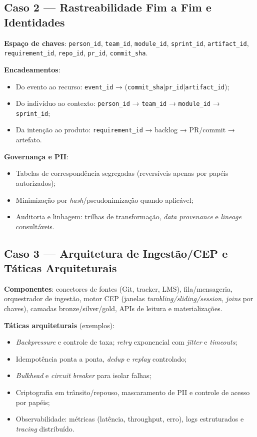 \subsection{Caso 2 — Rastreabilidade Fim a Fim e Identidades}

\textbf{Espaço de chaves}: \texttt{person\_id}, \texttt{team\_id}, \texttt{module\_id}, \texttt{sprint\_id}, \texttt{artifact\_id}, \texttt{requirement\_id}, \texttt{repo\_id}, \texttt{pr\_id}, \texttt{commit\_sha}.

\textbf{Encadeamentos}:
\begin{itemize}
  \item Do evento ao recurso: \texttt{event\_id} → (\texttt{commit\_sha}|\texttt{pr\_id}|\texttt{artifact\_id});
  \item Do indivíduo ao contexto: \texttt{person\_id} → \texttt{team\_id} → \texttt{module\_id} → \texttt{sprint\_id};
  \item Da intenção ao produto: \texttt{requirement\_id} → backlog → PR/commit → artefato.
\end{itemize}

\textbf{Governança e PII}:
\begin{itemize}
  \item Tabelas de correspondência segregadas (reversíveis apenas por papéis autorizados);
  \item Minimização por \textit{hash}/pseudonimização quando aplicável;
  \item Auditoria e linhagem: trilhas de transformação, \textit{data provenance} e \textit{lineage} consultáveis.
\end{itemize}

\subsection{Caso 3 — Arquitetura de Ingestão/CEP e Táticas Arquiteturais}

\textbf{Componentes}: conectores de fontes (Git, tracker, LMS), fila/mensageria, orquestrador de ingestão, motor CEP (janelas \textit{tumbling/sliding/session}, \textit{joins} por chaves), camadas bronze/silver/gold, APIs de leitura e materializações.

\textbf{Táticas arquiteturais} (exemplos):
\begin{itemize}
  \item \textit{Backpressure} e controle de taxa; \textit{retry} exponencial com \textit{jitter} e \textit{timeouts};
  \item Idempotência ponta a ponta, \textit{dedup} e \textit{replay} controlado;
  \item \textit{Bulkhead} e \textit{circuit breaker} para isolar falhas;
  \item Criptografia em trânsito/repouso, mascaramento de PII e controle de acesso por papéis;
  \item Observabilidade: métricas (latência, throughput, erro), logs estruturados e \textit{tracing} distribuído.
\end{itemize}

